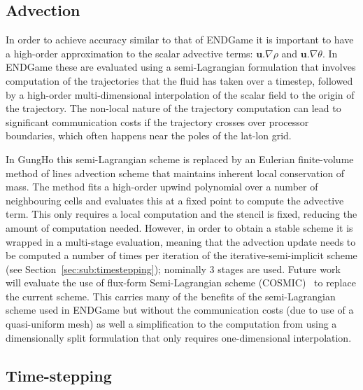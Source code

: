 \documentclass[review,times]{elsarticle}
\begin{document}
\subsection{Advection\label{sec:sub:advection}}

In order to achieve accuracy similar to that of ENDGame it is important to have 
a high-order approximation to the scalar advective terms: $\mathbf{u}.\nabla\rho$ 
and $\mathbf{u}.\nabla\theta$. In ENDGame these are evaluated using a 
semi-Lagrangian formulation that involves computation of the trajectories that 
the fluid has taken over a timestep, followed by a high-order multi-dimensional 
interpolation of the scalar field to the origin of the trajectory. 
The non-local nature of the trajectory computation can 
lead to significant communication costs if the trajectory crosses over processor 
boundaries, which often happens near the poles of the lat-lon grid.

In GungHo this semi-Lagrangian scheme is replaced by an Eulerian finite-volume 
method of lines advection scheme that maintains inherent local conservation of mass.
The method fits a high-order upwind polynomial over a number of
neighbouring cells and evaluates this at a fixed point to compute the advective 
term. This only requires a local computation and the stencil is fixed, reducing the 
amount of computation needed. However, in order to obtain a stable scheme it is 
wrapped in a multi-stage evaluation, meaning that the advection update needs to be 
computed a number of times per iteration of the iterative-semi-implicit scheme
(see Section~\ref{sec:sub:timestepping}); nominally 3 stages are used. 
Future work will evaluate the use of flux-form Semi-Lagrangian scheme (COSMIC)~\cite{Leonard1996} 
to replace the current scheme. This carries many of the 
benefits of the semi-Lagrangian scheme used in ENDGame but without the 
communication costs (due to use of a quasi-uniform mesh) as well a simplification 
to the computation from using a dimensionally split formulation that only requires 
one-dimensional interpolation.

\subsection{Time-stepping\label{sec:sub:timestepping}}
\end{document}
